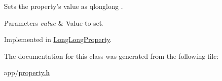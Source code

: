 Sets the property's value as qlonglong . 


\begin{DoxyParams}{Parameters}
{\em value} & Value to set. \\
\hline
\end{DoxyParams}


Implemented in \hyperlink{class_long_long_property_abff074961b681f08072260664b0221f6}{Long\-Long\-Property}.



The documentation for this class was generated from the following file\-:\begin{DoxyCompactItemize}
\item 
app/\hyperlink{property_8h}{property.\-h}\end{DoxyCompactItemize}
